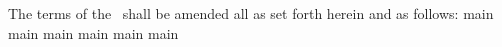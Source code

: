 The terms of the \lease\ shall be amended all as set forth herein and as follows:
\newline
{main}
{main}
{main}
{main}
{main}
{main}
